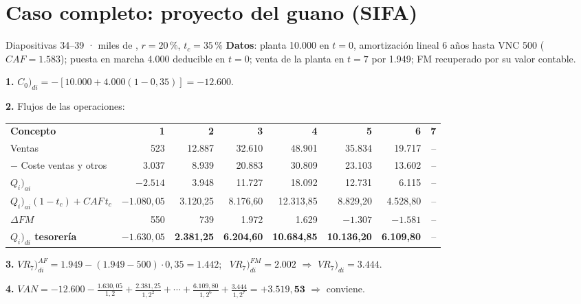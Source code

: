 \documentclass[10pt,a4paper,twoside]{article}
\newcommand{\di}{)_{di}}
\newcommand{\ai}{)_{ai}}
\newcommand{\thead}[1]{\leavevmode\sffamily\bfseries\color{white}#1}
\newcommand{\headrow}{\rowcolor{steel}}
\begin{document}
\section{Caso completo: proyecto del guano (SIFA)}
\begin{ejemplo}{Diapositivas 34–39 · miles de \texteuro, $r=20\,\%$, $t_c=35\,\%$}
\textbf{Datos}: planta 10.000 en $t=0$, amortización lineal 6 años hasta VNC 500 ($CAF=1.583$); puesta en marcha 4.000
deducible en $t=0$; venta de la planta en $t=7$ por 1.949; FM recuperado por su valor contable.

\textbf{1.} $C_0\di=-[10.000+4.000(1-0,35)]=\mathbf{-12.600}$.

\textbf{2.} Flujos de las operaciones:
\begin{center}\scriptsize\setlength{\tabcolsep}{3.4pt}
\begin{tabular}{@{}l *{7}{r}@{}}
\headrow \thead{Concepto} & \thead{1} & \thead{2} & \thead{3} & \thead{4} & \thead{5} & \thead{6} & \thead{7}\\
Ventas & 523 & 12.887 & 32.610 & 48.901 & 35.834 & 19.717 & --\\
\rowcolor{mist}$-$ Coste ventas y otros & 3.037 & 8.939 & 20.883 & 30.809 & 23.103 & 13.602 & --\\
$Q_i\ai$ & $-2.514$ & 3.948 & 11.727 & 18.092 & 12.731 & 6.115 & --\\
\rowcolor{mist}$Q_i\ai(1-t_c)+CAF\,t_c$ & $-1.080,05$ & 3.120,25 & 8.176,60 & 12.313,85 & 8.829,20 & 4.528,80 & --\\
$\Delta FM$ & 550 & 739 & 1.972 & 1.629 & $-1.307$ & $-1.581$ & --\\
\rowcolor{mist}\bfseries $Q_i\di$ tesorería & \bfseries $-1.630,05$ & \bfseries 2.381,25 & \bfseries 6.204,60 & \bfseries 10.684,85 & \bfseries 10.136,20 & \bfseries 6.109,80 & --\\
\end{tabular}
\end{center}

\textbf{3.} $VR_7\di^{AF}=1.949-(1.949-500)\cdot0,35=1.442$; \ $VR_7\di^{FM}=2.002$ $\Rightarrow$ $VR_7\di=\mathbf{3.444}$.

\textbf{4.} $VAN=-12.600-\frac{1.630,05}{1,2}+\frac{2.381,25}{1,2^2}+\cdots+\frac{6.109,80}{1,2^6}+\frac{3.444}{1,2^7}=\mathbf{+3.519,53}$ $\Rightarrow$ conviene.
\end{ejemplo}
\end{document}
